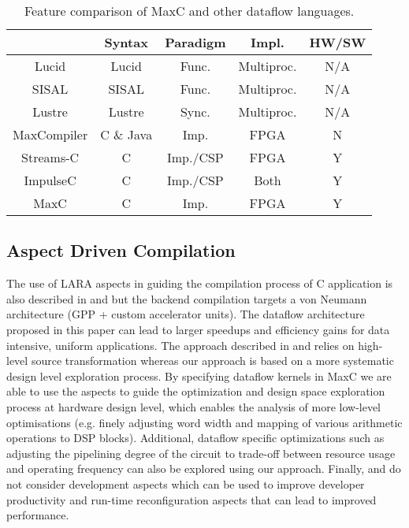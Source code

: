 \begin{table}[!h]
  \renewcommand{\arraystretch}{1.3}
  \centering
  \caption{Feature comparison of MaxC and other dataflow languages.}
  \label{table:feature-comparison}
  \begin{tabular}{ c |  c |  c |  c |  c }
    \hline
    \           & \bf{Syntax} & \bf{Paradigm} & \bf{Impl.} & \bf{HW/SW} \\
    \hline \hline
    Lucid       & Lucid       & Func.         & Multiproc. & N/A        \\
    SISAL       & SISAL       & Func.         & Multiproc. & N/A        \\
    Lustre      & Lustre      & Sync.         & Multiproc. & N/A        \\
    MaxCompiler & C \& Java   & Imp.          & FPGA       & N          \\
    Streams-C   & C           & Imp./CSP      & FPGA       & Y          \\
    ImpulseC    & C           & Imp./CSP      & Both & Y          \\
    MaxC        & C           & Imp.           & FPGA       & Y          \\
  \end{tabular}
\end{table}

\subsection{Aspect Driven Compilation}

The use of LARA aspects in guiding the compilation process of C
application is also described in
\cite{Cardoso:Teixeira:Alves:Nobre:Diniz:Cutinho:Luk:2012} and
\cite{cardoso2011new} but the backend compilation targets a von
Neumann architecture (GPP + custom accelerator units). The dataflow
architecture proposed in this paper can lead to larger speedups and
efficiency gains for data intensive, uniform applications. The
approach described in
\cite{Cardoso:Teixeira:Alves:Nobre:Diniz:Cutinho:Luk:2012} and
\cite{cardoso2011new} relies on high-level source transformation
whereas our approach is based on a more systematic design level
exploration process. By specifying dataflow kernels in MaxC we are
able to use the aspects to guide the optimization and design space
exploration process at hardware design level, which enables the
analysis of more low-level optimisations (e.g. finely adjusting word
width and mapping of various arithmetic operations to DSP
blocks). Additional, dataflow specific optimizations such as adjusting
the pipelining degree of the circuit to trade-off between resource
usage and operating frequency can also be explored using our
approach. Finally,
\cite{Cardoso:Teixeira:Alves:Nobre:Diniz:Cutinho:Luk:2012} and
\cite{cardoso2011new} do not consider development aspects which can be
used to improve developer productivity and run-time reconfiguration
aspects that can lead to improved performance.

